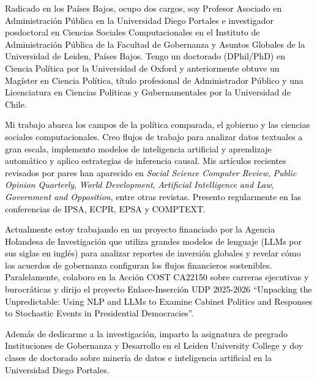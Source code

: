 \begin{cvparagraph}

\textcolor{black}{Radicado en los Países Bajos, ocupo dos cargos, soy Profesor Asociado en Administración Pública en la Universidad Diego Portales e investigador posdoctoral en Ciencias Sociales Computacionales en el Instituto de Administración Pública de la Facultad de Gobernanza y Asuntos Globales de la Universidad de Leiden, Países Bajos. Tengo un doctorado (DPhil/PhD) en Ciencia Política por la Universidad de Oxford y anteriormente obtuve un Magíster en Ciencia Política, título profesional de Administrador Público y una Licenciatura en Ciencias Políticas y Gubernamentales por la Universidad de Chile.}

\textcolor{black}{Mi trabajo abarca los campos de la política comparada, el gobierno y las ciencias sociales computacionales. Creo flujos de trabajo para analizar datos textuales a gran escala, implemento modelos de inteligencia artificial y aprendizaje automático y aplico estrategias de inferencia causal. Mis artículos recientes revisados por pares han aparecido en {\itshape Social Science Computer Review}, {\itshape Public Opinion Quarterly}, {\itshape World Development}, {\itshape Artificial Intelligence and Law}, {\itshape Government and Opposition}, entre otras revistas. Presento regularmente en las conferencias de IPSA, ECPR, EPSA y COMPTEXT.}

\textcolor{black}{Actualmente estoy trabajando en un proyecto financiado por la Agencia Holandesa de Investigación que utiliza grandes modelos de lenguaje (LLMs por sus siglas en inglés) para analizar reportes de inversión globales y revelar cómo los acuerdos de gobernanza configuran los flujos financieros sostenibles. Paralelamente, colaboro en la Acción COST CA22150 sobre carreras ejecutivas y burocráticas y dirijo el proyecto Enlace-Inserción UDP 2025-2026 “Unpacking the Unpredictable: Using NLP and LLMs to Examine Cabinet Politics and Responses to Stochastic Events in Presidential Democracies''.}

\textcolor{black}{Además de dedicarme a la investigación, imparto la asignatura de pregrado Instituciones de Gobernanza y Desarrollo en el Leiden University College y doy clases de doctorado sobre minería de datos e inteligencia artificial en la Universidad Diego Portales.}
\vspace{1mm}
\end{cvparagraph}